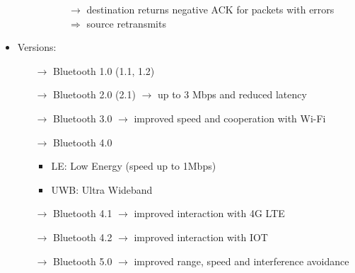 \begin{itemize}
\begin{itemize}
\begin{itemize}
\begin{itemize}
                $\rightarrow$ destination returns negative ACK for packets with errors\\
                $\Rightarrow$ source retransmits
            \end{itemize}
        \end{itemize}
    \end{itemize}
    \item Versions:
    \begin{itemize}
        \item[$\rightarrow$] Bluetooth 1.0 (1.1, 1.2)
        \item[$\rightarrow$] Bluetooth 2.0 (2.1) $\rightarrow$ up to 3 Mbps and reduced latency
        \item[$\rightarrow$] Bluetooth 3.0 $\rightarrow$ improved speed and cooperation with Wi-Fi
        \item[$\rightarrow$] Bluetooth 4.0
        \begin{itemize}
            \item LE: Low Energy (speed up to 1Mbps)
            \item UWB: Ultra Wideband
        \end{itemize}
        \item[$\rightarrow$] Bluetooth 4.1 $\rightarrow$ improved interaction with 4G LTE
        \item[$\rightarrow$] Bluetooth 4.2 $\rightarrow$ improved interaction with IOT
        \item[$\rightarrow$] Bluetooth 5.0 $\rightarrow$ improved range, speed and interference avoidance
    \end{itemize}
\end{itemize}
